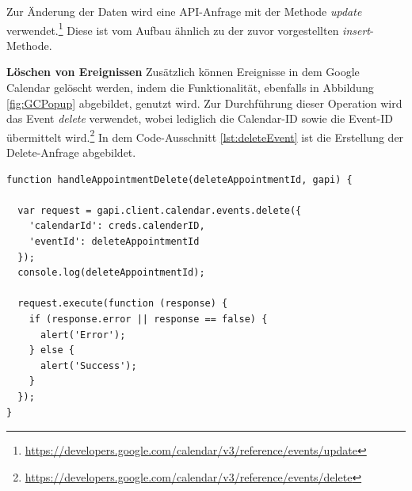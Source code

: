 Zur Änderung der Daten wird eine \ac{API}-Anfrage mit der Methode \textit{update} verwendet.\footnote{\url{https://developers.google.com/calendar/v3/reference/events/update}} 
Diese ist vom Aufbau ähnlich zu der zuvor vorgestellten \textit{insert}-Methode.

\textbf{Löschen von Ereignissen}\newline
Zusätzlich können Ereignisse in dem Google Calendar gelöscht werden, indem die Funktionalität, ebenfalls in Abbildung \vref{fig:GCPopup} abgebildet, genutzt wird. 
Zur Durchführung dieser Operation wird das Event \textit{delete} verwendet, wobei lediglich die Calendar-ID sowie die Event-ID übermittelt wird.\footnote{\url{https://developers.google.com/calendar/v3/reference/events/delete}}   
In dem Code-Ausschnitt \vref{lst:deleteEvent} ist die Erstellung der Delete-Anfrage abgebildet.

\lstset{language=JavaScript}
\begin{lstlisting}[caption={Anfrage zum Löschen eines Ereignisses}, label={lst:deleteEvent}]
function handleAppointmentDelete(deleteAppointmentId, gapi) {

  var request = gapi.client.calendar.events.delete({
    'calendarId': creds.calenderID,
    'eventId': deleteAppointmentId
  });
  console.log(deleteAppointmentId);

  request.execute(function (response) {
    if (response.error || response == false) {
      alert('Error');
    } else {
      alert('Success');
    }
  });
}
\end{lstlisting}


